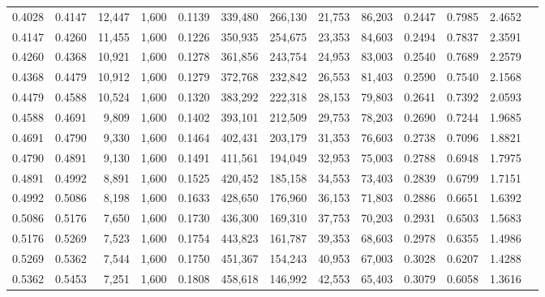 \begin{tabular}{rrrrrrrrrrrrr}
0.4028 & 0.4147 & 12,447 & 1,600 &                                     0.1139 & 339,480 & 266,130 &  21,753 &  86,203 & 0.2447 & 0.7985 & 2.4652 \\
0.4147 & 0.4260 & 11,455 & 1,600 &                                     0.1226 & 350,935 & 254,675 &  23,353 &  84,603 & 0.2494 & 0.7837 & 2.3591 \\
0.4260 & 0.4368 & 10,921 & 1,600 &                                     0.1278 & 361,856 & 243,754 &  24,953 &  83,003 & 0.2540 & 0.7689 & 2.2579 \\
0.4368 & 0.4479 & 10,912 & 1,600 &                                     0.1279 & 372,768 & 232,842 &  26,553 &  81,403 & 0.2590 & 0.7540 & 2.1568 \\
0.4479 & 0.4588 & 10,524 & 1,600 &                                     0.1320 & 383,292 & 222,318 &  28,153 &  79,803 & 0.2641 & 0.7392 & 2.0593 \\
0.4588 & 0.4691 &  9,809 & 1,600 &                                     0.1402 & 393,101 & 212,509 &  29,753 &  78,203 & 0.2690 & 0.7244 & 1.9685 \\
0.4691 & 0.4790 &  9,330 & 1,600 &                                     0.1464 & 402,431 & 203,179 &  31,353 &  76,603 & 0.2738 & 0.7096 & 1.8821 \\
0.4790 & 0.4891 &  9,130 & 1,600 &                                     0.1491 & 411,561 & 194,049 &  32,953 &  75,003 & 0.2788 & 0.6948 & 1.7975 \\
0.4891 & 0.4992 &  8,891 & 1,600 &                                     0.1525 & 420,452 & 185,158 &  34,553 &  73,403 & 0.2839 & 0.6799 & 1.7151 \\
0.4992 & 0.5086 &  8,198 & 1,600 &                                     0.1633 & 428,650 & 176,960 &  36,153 &  71,803 & 0.2886 & 0.6651 & 1.6392 \\
0.5086 & 0.5176 &  7,650 & 1,600 &                                     0.1730 & 436,300 & 169,310 &  37,753 &  70,203 & 0.2931 & 0.6503 & 1.5683 \\
0.5176 & 0.5269 &  7,523 & 1,600 &                                     0.1754 & 443,823 & 161,787 &  39,353 &  68,603 & 0.2978 & 0.6355 & 1.4986 \\
0.5269 & 0.5362 &  7,544 & 1,600 &                                     0.1750 & 451,367 & 154,243 &  40,953 &  67,003 & 0.3028 & 0.6207 & 1.4288 \\
0.5362 & 0.5453 &  7,251 & 1,600 &                                     0.1808 & 458,618 & 146,992 &  42,553 &  65,403 & 0.3079 & 0.6058 & 1.3616 \\

\end{tabular}
